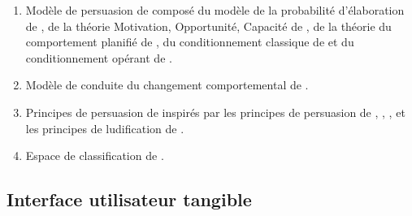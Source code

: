 \documentclass[10pt,a5paper,twoside]{article}
\begin{document}
\begin{enumerate}
\begin{itemize}
    \citet{valkanova2013reveal} -.
  \end{itemize}
\item
  Modèle de persuasion de \citet{kaptein2010persuasion} composé du
  modèle de la probabilité d'élaboration de
  \citet{petty1986elaboration}, de la théorie Motivation, Opportunité,
  Capacité de \citet{maclnnis1989information}, de la théorie du
  comportement planifié de \citet{dillon1996user}, du conditionnement
  classique de \citet{patterson1987rabbit} et du conditionnement opérant
  de \citet{skinner1976behaviorism}.
\item
  Modèle de conduite du changement comportemental de
  \citet{prochaska2005transtheoretical}.
\item
  Principes de persuasion de \citet{negri2015ludo} inspirés par les
  principes de persuasion de \citet{fogg2002persuasive},
  \citet{oinas2009persuasive}, \citet{nemery2012development},
  \citet{cialdini2004influence} et les principes de ludification de
  \citet{zichermann2011gamification}.
\item
  Espace de classification de \citet{cano2015persuasive}.
\end{enumerate}

\subsection{Interface utilisateur
tangible}\label{interface-utilisateur-tangible}
\end{document}
